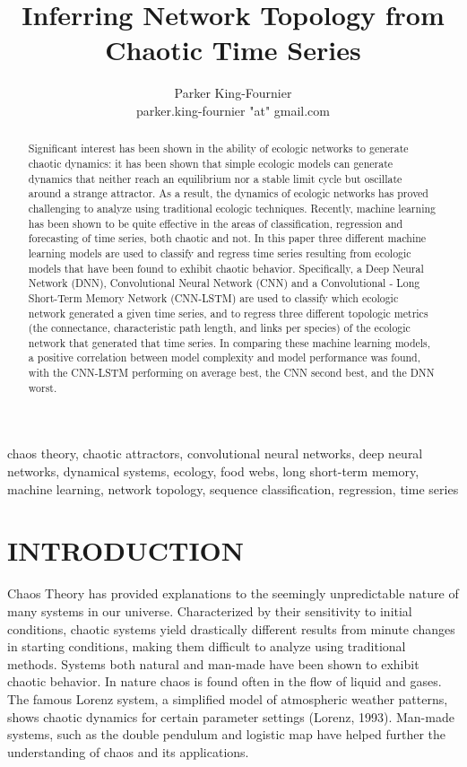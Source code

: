 \documentclass[letterpaper, 10 pt, conference]{ieeeconf}  %
\title{\LARGE \bf
Inferring Network Topology from Chaotic Time Series
}
\author{Parker King-Fournier \\
		parker.king-fournier "at" gmail.com}
\begin{document}
\maketitle
\thispagestyle{empty}
\pagestyle{empty}

\begin{abstract}
Signiﬁcant interest has been shown in the ability of ecologic networks to generate chaotic dynamics: it has been shown that simple ecologic models can generate dynamics that neither reach an equilibrium nor a stable limit cycle but oscillate around a strange attractor. As a result, the dynamics of ecologic networks has proved challenging to analyze using traditional ecologic techniques. Recently, machine learning has been shown to be quite effective in the areas of classification, regression and forecasting of time series, both chaotic and not. In this paper three different machine learning models are used to classify and regress time series resulting from ecologic models that have been found to exhibit chaotic behavior. Specifically, a Deep Neural Network (DNN), Convolutional Neural Network (CNN) and a Convolutional - Long Short-Term Memory Network (CNN-LSTM) are used to classify which ecologic network generated a given time series, and to regress three different topologic metrics (the connectance, characteristic path length, and links per species) of the ecologic network that generated that time series. In comparing these machine learning models, a positive correlation between model complexity and model performance was found, with the CNN-LSTM performing on average best, the CNN second best, and the DNN worst.
\end{abstract}
\begin{keywords}
chaos theory, chaotic attractors, convolutional neural networks, deep neural networks, dynamical systems, ecology, food webs, long short-term memory, machine learning, network topology, sequence classiﬁcation, regression, time series 
\end{keywords}


\section{INTRODUCTION}
	Chaos Theory has provided explanations to the seemingly unpredictable nature of many systems in our universe. Characterized by their sensitivity to initial conditions, chaotic systems yield drastically different results from minute changes in starting conditions, making them difficult to analyze using traditional methods. Systems both natural and man-made have been shown to exhibit chaotic behavior. In nature chaos is found often in the flow of liquid and gases. The famous Lorenz system, a simplified model of atmospheric weather patterns, shows chaotic dynamics for certain parameter settings (Lorenz, 1993). Man-made systems, such as the double pendulum and logistic map have helped further the understanding of chaos and its applications.
\end{document}
